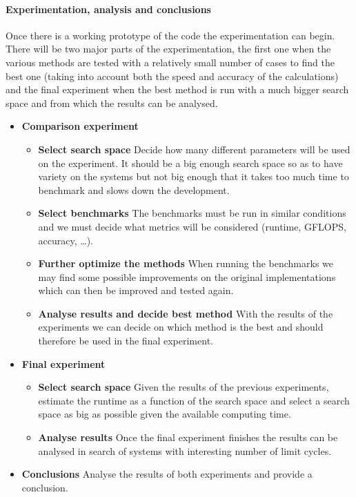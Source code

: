 \paragraph{Experimentation, analysis and conclusions}

Once there is a working prototype of the code the experimentation can begin.
There will be two major parts of the experimentation, the first one when the
various methods are tested with a relatively small number of cases to find the
best one (taking into account both the speed and accuracy of the calculations)
and the final experiment when the best method is run with a much bigger search
space and from which the results can be analysed.

\begin{itemize}
    \item \textbf{Comparison experiment}
        \begin{itemize}
            \item \textbf{Select search space} Decide how many different
                parameters will be used on the experiment. It should be a big
                enough search space so as to have variety on the systems but not
                big enough that it takes too much time to benchmark and slows
                down the development.
            \item \textbf{Select benchmarks} The benchmarks must be run in
                similar conditions and we must decide what metrics will be
                considered (runtime, GFLOPS, accuracy, \dots).
            \item \textbf{Further optimize the methods} When running the
                benchmarks we may find some possible improvements on the
                original implementations which can then be improved and tested
                again.
            \item \textbf{Analyse results and decide best method} With the
                results of the experiments we can decide on which method is the
                best and should therefore be used in the final experiment.
        \end{itemize}
    \item \textbf{Final experiment}
        \begin{itemize}
            \item \textbf{Select search space} Given the results of the previous
                experiments, estimate the runtime as a function of the search
                space and select a search space as big as possible given the
                available computing time.
            \item \textbf{Analyse results} Once the final experiment finishes
                the results can be analysed in search of systems with
                interesting number of limit cycles.
        \end{itemize}
    \item \textbf{Conclusions} Analyse the results of both experiments and
        provide a conclusion.
\end{itemize}

